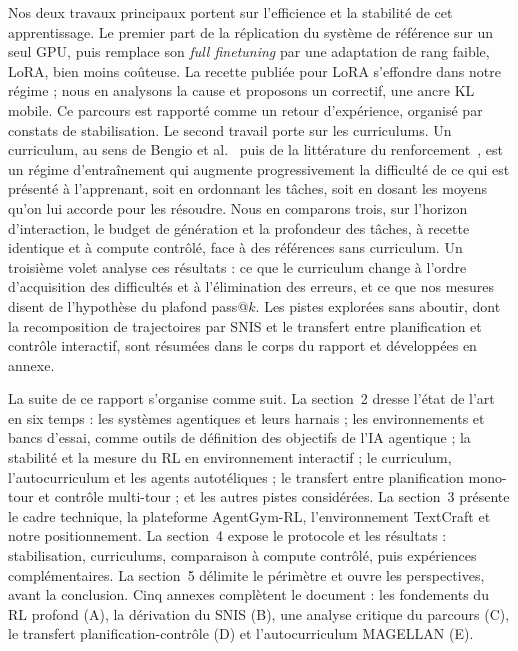 \documentclass[11pt,a4paper]{article}
\begin{document}
Nos deux travaux principaux portent sur l'efficience et la stabilité de cet apprentissage. Le premier part de la réplication du système de référence sur un seul GPU, puis remplace son \emph{full finetuning} par une adaptation de rang faible, LoRA, bien moins coûteuse. La recette publiée pour LoRA s'effondre dans notre régime ; nous en analysons la cause et proposons un correctif, une ancre KL mobile. Ce parcours est rapporté comme un retour d'expérience, organisé par constats de stabilisation. Le second travail porte sur les curriculums. Un curriculum, au sens de Bengio et al.~\cite{bengio2009curriculum} puis de la littérature du renforcement~\cite{narvekar2020curriculum}, est un régime d'entraînement qui augmente progressivement la difficulté de ce qui est présenté à l'apprenant, soit en ordonnant les tâches, soit en dosant les moyens qu'on lui accorde pour les résoudre. Nous en comparons trois, sur l'horizon d'interaction, le budget de génération et la profondeur des tâches, à recette identique et à compute contrôlé, face à des références sans curriculum. Un troisième volet analyse ces résultats : ce que le curriculum change à l'ordre d'acquisition des difficultés et à l'élimination des erreurs, et ce que nos mesures disent de l'hypothèse du plafond pass@$k$. Les pistes explorées sans aboutir, dont la recomposition de trajectoires par SNIS et le transfert entre planification et contrôle interactif, sont résumées dans le corps du rapport et développées en annexe.

La suite de ce rapport s'organise comme suit. La section~2 dresse l'état de l'art en six temps : les systèmes agentiques et leurs harnais ; les environnements et bancs d'essai, comme outils de définition des objectifs de l'IA agentique ; la stabilité et la mesure du RL en environnement interactif ; le curriculum, l'autocurriculum et les agents autotéliques ; le transfert entre planification mono-tour et contrôle multi-tour ; et les autres pistes considérées. La section~3 présente le cadre technique, la plateforme AgentGym-RL, l'environnement TextCraft et notre positionnement. La section~4 expose le protocole et les résultats : stabilisation, curriculums, comparaison à compute contrôlé, puis expériences complémentaires. La section~5 délimite le périmètre et ouvre les perspectives, avant la conclusion. Cinq annexes complètent le document : les fondements du RL profond (A), la dérivation du SNIS (B), une analyse critique du parcours (C), le transfert planification-contrôle (D) et l'autocurriculum MAGELLAN (E).
\end{document}
